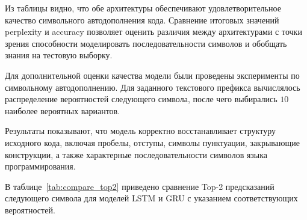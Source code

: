 Из таблицы видно, что обе архитектуры обеспечивают удовлетворительное качество
символьного автодополнения кода. Сравнение итоговых значений perplexity и
accuracy позволяет оценить различия между архитектурами с точки зрения
способности моделировать последовательности символов и обобщать знания на
тестовую выборку.

Для дополнительной оценки качества модели были проведены эксперименты по
символьному автодополнению. Для заданного текстового префикса вычислялось
распределение вероятностей следующего символа, после чего выбирались $10$
наиболее вероятных вариантов.

Результаты показывают, что модель корректно восстанавливает структуру исходного
кода, включая пробелы, отступы, символы пунктуации, закрывающие конструкции, а
также характерные последовательности символов языка программирования.

В таблице~\ref{tab:compare_top2} приведено сравнение Top-2 предсказаний следующего символа для моделей LSTM и GRU с указанием соответствующих вероятностей.

